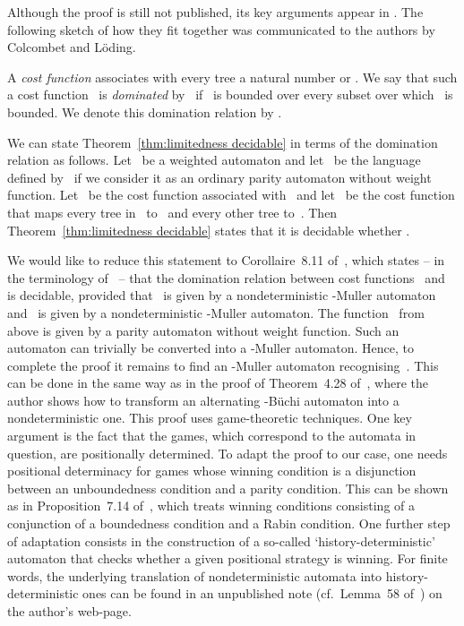 \documentclass{LMCS}
\begin{document}
Although the proof is still not published, its key arguments appear
in \cite{VandenBoom12,Colcombet13}.
The following sketch of how they fit together was communicated to the
authors by Colcombet and L\"oding.

A \emph{cost function} 
associates with every tree a natural number or .
We say that such a cost function~ is \emph{dominated} by~ if
~is bounded over every subset  over which~ is bounded.
We denote this domination relation by .

We can state Theorem~\ref{thm:limitedness decidable} in terms of the
domination relation as follows.
Let ~be a weighted automaton and let ~be the language defined by~
if we consider it as an ordinary parity automaton without weight function.
Let ~be the cost function  associated with~ and let ~be the
cost function that maps every tree in~ to~ and every other tree
to~.
Then Theorem~\ref{thm:limitedness decidable} states that it is decidable
whether .

We would like to reduce this statement to Corollaire~8.11 of~\cite{Colcombet13},
which states -- in the terminology of~\cite{Colcombet13} --
that the domination relation  between cost functions
~and~ is decidable, provided that ~is given by a nondeterministic
-Muller automaton and ~is given by a nondeterministic -Muller
automaton.
The function~ from above is given by a parity automaton without weight
function.
Such an automaton can trivially be converted into a -Muller automaton.
Hence, to complete the proof it remains to find an -Muller automaton
recognising~.
This can be done in the same way as in the proof of Theorem~4.28
of~\cite{VandenBoom12}, where the author shows how to transform an
alternating -B\"uchi automaton into a nondeterministic one.
This proof uses game-theoretic techniques.
One key argument is the fact that the games, which correspond to the
automata in question, are positionally determined.
To adapt the proof to our case, one needs positional determinacy for games
whose winning condition is a disjunction between an unboundedness condition
and a parity condition.
This can be shown as in Proposition~7.14 of~\cite{Colcombet13},
which treats winning conditions consisting of a conjunction of a boundedness
condition and a Rabin condition.
One further step of adaptation consists in the construction of a so-called
`history-deterministic' automaton that checks whether a given positional
strategy is winning.
For finite words, the underlying translation of nondeterministic automata into
history-deterministic ones can be found in an unpublished note
(cf.~Lemma~58 of~\cite{Colcombet09b}) on the author's web-page.
\end{document}
